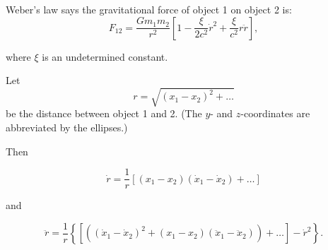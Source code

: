 Weber's law says the gravitational force of object 1 on object 2 is:
$$F_{12}=\frac{Gm_1m_2}{r^2}\left[1-\frac{\xi}{2c^2}\dot{r}^2+\frac{\xi}{c^2}r\ddot{r}\right],$$

where $\xi$ is an undetermined constant.

Let $$r=\sqrt{(x_1-x_2)^2+\ldots}$$ be the distance between object 1 and 2. (The $y$- and $z$-coordinates are abbreviated by the ellipses.)

Then

$$\dot{r}=\frac{1}{r}\left[(x_1-x_2)(\dot{x}_1-\dot{x}_2)+\ldots\right]$$

and

$$\ddot{r}=\frac{1}{r}\left\{\left[\left((\dot{x}_1-\dot{x}_2)^2+(x_1-x_2)(\ddot{x}_1-\ddot{x}_2)\right)+\ldots\right]-\dot{r}^2\right\}.$$
